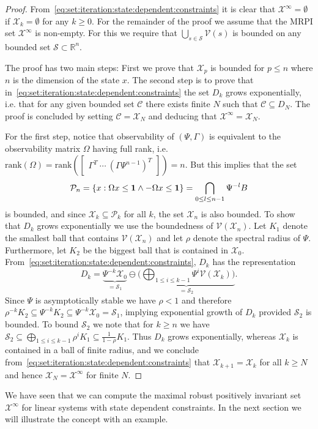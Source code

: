 \documentclass[letterpaper, 10pt, conference]{ieeeconf} %
\begin{document}
\begin{proof}
From~\eqref{eq:set:iteration:state:dependent:constraints} it is clear that $\mathcal X^\infty = \emptyset$ 
if $\mathcal X_k =\emptyset$ for any $k\geq 0$. For the remainder of the proof we assume that the MRPI set 
$\mathcal X^\infty$ is non-empty. For this we require that $\bigcup_{s\in\mathcal S}\mathcal V(s)$ is 
bounded on any bounded set $\mathcal S\subset\mathbb R^n$.

The proof has two main steps: First we prove that $\mathcal X_p$ is bounded for $p\leq n$
where $n$ is the dimension of the state $x$. The second step is to prove that in~\eqref{eq:set:iteration:state:dependent:constraints}
the set $D_k$ grows exponentially, i.e. that for any given bounded set $\mathcal C$ there exists
finite $N$ such that $\mathcal C\subseteq D_{N}$. The proof is concluded by setting 
$\mathcal C = \mathcal X_{N}$ and deducing that $\mathcal X^\infty = \mathcal X_N$. 

For the first step, notice that observability of $(\Psi,\Gamma)$ is equivalent to the observability matrix 
$\Omega$ having full rank, i.e.\ $\mathrm{rank}(\Omega) = \mathrm{rank}(\begin{bmatrix} \Gamma^T \ \cdots \ 
(\Gamma\Psi^{n-1})^T\end{bmatrix}) = n$.
But  this implies that the set 
%
\[
\mathcal P_{n} = \{x: 
\Omega x\leq{\bf{1}}\wedge-\Omega x\leq{\bf{1}}\} = \bigcap_{0\leq l\leq n-1} \Psi^{-l} B
\]
%
is bounded, and since $\mathcal X_k\subseteq \mathcal P_k$ for all $k$, 
the set $\mathcal X_{n}$ is also bounded. To show that $D_k$ grows exponentially we use the boundedness 
of $\mathcal V(\mathcal X_{n})$. Let $K_1$ denote the smallest ball that contains $\mathcal V(\mathcal X_{n})$ and let
$\rho$ denote the spectral radius of $\Psi$. Furthermore, let $K_2$
be the biggest ball that is contained in $\mathcal X_{0}$. From~\eqref{eq:set:iteration:state:dependent:constraints}, 
$D_k$ has the representation
%
\begin{equation}
D_k = \underbrace{\Psi^{-k}\mathcal X_0}_{=\mathcal S_1} \ominus \underbrace{\biggl(\bigoplus_{1\leq i\leq k-1} 
\Psi^i\mathcal V(\mathcal X_k)\biggr)}_{=\mathcal S_2}.
\end{equation}
%
Since $\Psi$ is asymptotically stable we have $\rho<1$ and therefore $\rho^{-k}K_2\subseteq\Psi^{-k} K_2 
\subseteq \Psi^{-k}\mathcal X_0 = \mathcal S_1$, implying exponential growth of $D_k$ provided $\mathcal S_2$ 
is bounded. To bound $\mathcal S_2$ we note that for $k\geq n$ we have $\mathcal S_2\subseteq 
\bigoplus_{1\leq i\leq k-1} \rho^i K_1 \subseteq \frac{1}{1-\rho} K_1$. Thus $D_k$ grows exponentially, whereas 
$\mathcal X_k$ is contained in a ball of finite radius, and we conclude from~\eqref{eq:set:iteration:state:dependent:constraints} that 
$\mathcal X_{k+1} = \mathcal X _k$ for all $k\geq N$ and hence $\mathcal X _N = \mathcal X^\infty$ for finite $N$.
\end{proof}
%
We have seen that we can compute the maximal robust positively invariant set $\mathcal X^\infty$ for linear 
systems with state dependent constraints. In the next section we will illustrate the concept with an 
example.
%
%
%
\end{document}
